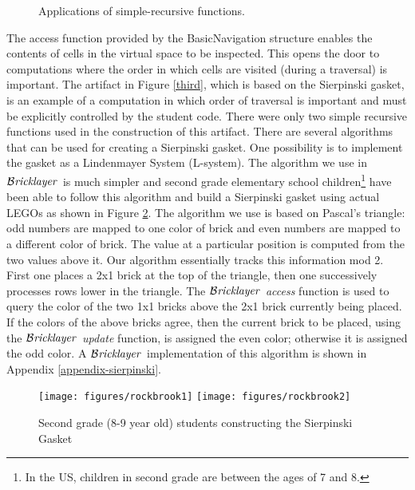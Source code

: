 \documentclass[submission,copyright,creativecommons]{eptcs}
\newcommand{\bricklayer}{\ensuremath{\mathcal{B}\emph{ricklayer}}}
\begin{document}
\begin{figure}[htb!]
\centering
{}
\caption{Applications of simple-recursive functions.}\label{fig-simple-recursive}
\end{figure}


The access function provided by the BasicNavigation structure enables the contents of cells in the virtual space to be inspected. This opens the door to computations where the order in which cells are visited (during a traversal) is important. The artifact in Figure \ref{third}, which is based on the Sierpinski gasket, is an example of a computation in which order of traversal is important and must be explicitly controlled by the student code. There were only two simple recursive functions used in the construction of this artifact. There are several algorithms that can be used for creating a Sierpinski gasket. One possibility is to implement the gasket as a Lindenmayer System (L-system). The algorithm we use in \bricklayer\ is much simpler and second grade elementary school children\footnote{In the US, children in second grade are between the ages of 7 and 8.} have been able to follow this algorithm and build a Sierpinski gasket using actual LEGOs as shown in Figure \ref{fig-sierpinski-lego}. The algorithm we use is based on Pascal's triangle: odd numbers are mapped to one color of brick and even numbers are mapped to a different color of brick. The value at a particular position is computed from the two values above it. Our algorithm essentially tracks this information mod 2. First one places a 2x1 brick at the top of the triangle, then one successively processes rows lower in the triangle. The \bricklayer\ \emph{access} function is used to query the color of the two 1x1 bricks above the 2x1 brick currently being placed. If the colors of the above bricks agree, then the current brick to be placed, using the \bricklayer\ \emph{update} function, is assigned the even color; otherwise it is assigned the odd color. A \bricklayer\ implementation of this algorithm is shown in Appendix \ref{appendix-sierpinski}.


\begin{figure}[htb!]
\centering
\texttt{[image: figures/rockbrook1]}
\texttt{[image: figures/rockbrook2]}

\caption{Second grade (8-9 year old) students constructing the Sierpinski Gasket}\label{fig-sierpinski-lego}
\end{figure}
\end{document}
